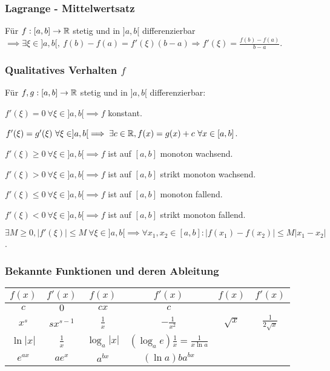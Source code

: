 \subsubsection{Lagrange - Mittelwertsatz}
Für $f:[a,b] \to \mathbb{R}$ stetig und in $]a,b[$ differenzierbar $\implies \exists \xi \in ]a,b[, \ f(b) - f(a) = f'(\xi)(b - a) \Rightarrow f'(\xi) = \frac{f(b) - f(a)}{b - a}$.

\subsubsection{Qualitatives Verhalten $f$}
Für $f,g: [a,b] \to \mathbb{R}$ stetig und in $]a, b[$ differenzierbar:
\begin{compactenum}
    \item $f'(\xi) = 0 \ \forall \xi \in ]a, b[ \implies f$ konstant.
    \item $f'(\xi) = g'(\xi) \ \forall \xi \in ]a, b[ \implies \exists c \in \mathbb{R}, f(x) = g(x) + c \ \forall x \in [a,b]$.
    \item $f'(\xi) \ge 0 \ \forall \xi \in ]a, b[ \implies f$ ist auf $[a,b]$ monoton wachsend.
    \item $f'(\xi) > 0 \ \forall \xi \in ]a, b[ \implies f$ ist auf $[a,b]$ strikt monoton wachsend.
    \item $f'(\xi) \le 0 \ \forall \xi \in ]a, b[ \implies f$ ist auf $[a,b]$ monoton fallend.
    \item $f'(\xi) < 0 \ \forall \xi \in ]a, b[ \implies f$ ist auf $[a,b]$ strikt monoton fallend.
    \item $\exists M \ge 0, |f'(\xi)| \le M \ \forall \xi \in ]a,b[ \implies \forall x_1, x_2 \in [a,b] : |f(x_1) - f(x_2)| \le M|x_1 - x_2|$.
\end{compactenum}

\subsubsection{Bekannte Funktionen und deren Ableitung}
\begin{tabular}{c | c || c | c || c | c}
    $f(x)$ & $f'(x)$    & $f(x)$ & $f'(x)$    & $f(x)$        & $f'(x)$\\\hline
    $c$    & $0$        & $cx$          & $c$              & \\\hline
    $x^s$  & $sx^{s-1}$ & $\frac{1}{x}$ & $-\frac{1}{x^2}$ & $\sqrt{x}$ & $\frac{1}{2\sqrt{x}}$\\\hline
    $\ln|x|$ & $\frac{1}{x}$ & $\log_a|x|$ & $(\log_ae) \frac{1}{x} = \frac{1}{x \ln a}$&\\\hline
    $e^{ax}$ & $ae^x$ & $a^{bx}$ & $(\ln a)b a^{b x}$ & \\\hline

\end{tabular}

